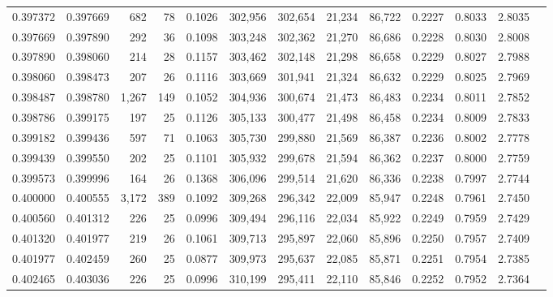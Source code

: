 \begin{tabular}{rrrrrrrrrrrrr}
0.397372 & 0.397669 &   682 &  78 &                                     0.1026 & 302,956 & 302,654 &  21,234 &  86,722 & 0.2227 & 0.8033 & 2.8035 \\
0.397669 & 0.397890 &   292 &  36 &                                     0.1098 & 303,248 & 302,362 &  21,270 &  86,686 & 0.2228 & 0.8030 & 2.8008 \\
0.397890 & 0.398060 &   214 &  28 &                                     0.1157 & 303,462 & 302,148 &  21,298 &  86,658 & 0.2229 & 0.8027 & 2.7988 \\
0.398060 & 0.398473 &   207 &  26 &                                     0.1116 & 303,669 & 301,941 &  21,324 &  86,632 & 0.2229 & 0.8025 & 2.7969 \\
0.398487 & 0.398780 & 1,267 & 149 &                                     0.1052 & 304,936 & 300,674 &  21,473 &  86,483 & 0.2234 & 0.8011 & 2.7852 \\
0.398786 & 0.399175 &   197 &  25 &                                     0.1126 & 305,133 & 300,477 &  21,498 &  86,458 & 0.2234 & 0.8009 & 2.7833 \\
0.399182 & 0.399436 &   597 &  71 &                                     0.1063 & 305,730 & 299,880 &  21,569 &  86,387 & 0.2236 & 0.8002 & 2.7778 \\
0.399439 & 0.399550 &   202 &  25 &                                     0.1101 & 305,932 & 299,678 &  21,594 &  86,362 & 0.2237 & 0.8000 & 2.7759 \\
0.399573 & 0.399996 &   164 &  26 &                                     0.1368 & 306,096 & 299,514 &  21,620 &  86,336 & 0.2238 & 0.7997 & 2.7744 \\
0.400000 & 0.400555 & 3,172 & 389 &                                     0.1092 & 309,268 & 296,342 &  22,009 &  85,947 & 0.2248 & 0.7961 & 2.7450 \\
0.400560 & 0.401312 &   226 &  25 &                                     0.0996 & 309,494 & 296,116 &  22,034 &  85,922 & 0.2249 & 0.7959 & 2.7429 \\
0.401320 & 0.401977 &   219 &  26 &                                     0.1061 & 309,713 & 295,897 &  22,060 &  85,896 & 0.2250 & 0.7957 & 2.7409 \\
0.401977 & 0.402459 &   260 &  25 &                                     0.0877 & 309,973 & 295,637 &  22,085 &  85,871 & 0.2251 & 0.7954 & 2.7385 \\
0.402465 & 0.403036 &   226 &  25 &                                     0.0996 & 310,199 & 295,411 &  22,110 &  85,846 & 0.2252 & 0.7952 & 2.7364 \\

\end{tabular}
